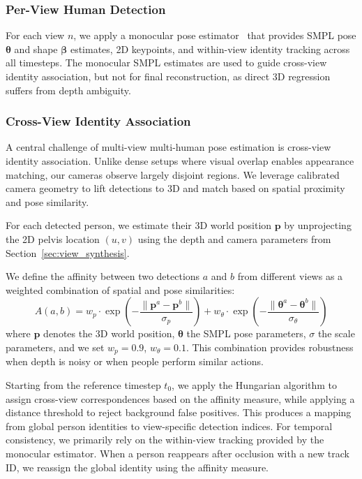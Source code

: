 \documentclass[acmtog]{acmart}
\begin{document}
\subsubsection{Per-View Human Detection}

For each view $n$, we apply a monocular pose estimator~\cite{newell2025comotion} that provides SMPL pose $\boldsymbol{\theta}$ and shape $\boldsymbol{\beta}$ estimates, 2D keypoints, and within-view identity tracking across all timesteps.
The monocular SMPL estimates are used to guide cross-view identity association, but not for final reconstruction, as direct 3D regression suffers from depth ambiguity.

\subsubsection{Cross-View Identity Association}

A central challenge of multi-view multi-human pose estimation is cross-view identity association. Unlike dense setups where visual overlap enables appearance matching, our cameras observe largely disjoint regions.
We leverage calibrated camera geometry to lift detections to 3D and match based on spatial proximity and pose similarity.

For each detected person, we estimate their 3D world position $\mathbf{p}$ by unprojecting the 2D pelvis location $(u, v)$ using the depth and camera parameters from Section~\ref{sec:view_synthesis}.

We define the affinity between two detections $a$ and $b$ from different views as a weighted combination of spatial and pose similarities:
\begin{equation}
A(a, b) = w_p \cdot \exp\left(-\frac{\|\mathbf{p}^a - \mathbf{p}^b\|}{\sigma_p}\right) + w_\theta \cdot \exp\left(-\frac{\|\boldsymbol{\theta}^a - \boldsymbol{\theta}^b\|}{\sigma_\theta}\right)
\end{equation}
where $\mathbf{p}$ denotes the 3D world position, $\boldsymbol{\theta}$ the SMPL pose parameters, $\sigma$ the scale parameters, and we set $w_p = 0.9$, $w_\theta = 0.1$.
This combination provides robustness when depth is noisy or when people perform similar actions.

Starting from the reference timestep $t_0$, we apply the Hungarian algorithm to assign cross-view correspondences based on the affinity measure, while applying a distance threshold to reject background false positives.
This produces a mapping from global person identities to view-specific detection indices. For temporal consistency, we primarily rely on the within-view tracking provided by the monocular estimator. When a person reappears after occlusion with a new track ID, we reassign the global identity using the affinity measure.
\end{document}

